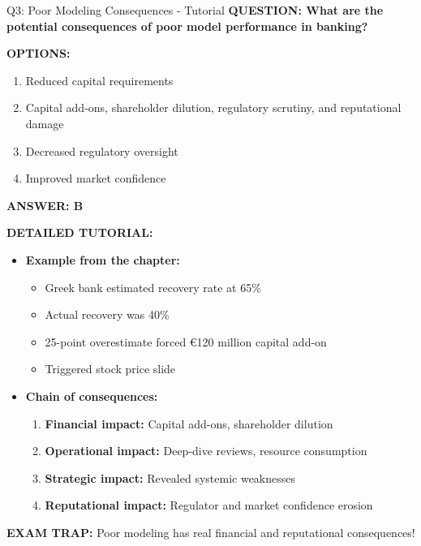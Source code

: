 \documentclass[8pt]{beamer}
\begin{document}
	\begin{frame}{Q3: Poor Modeling Consequences - Tutorial}
		\fontsize{6.5}{7.5}\selectfont
		\textbf{QUESTION: What are the potential consequences of poor model performance in banking?}
		
		\vspace{0.1cm}
		\textbf{OPTIONS:}
		\begin{enumerate}
			\item Reduced capital requirements
			\item Capital add-ons, shareholder dilution, regulatory scrutiny, and reputational damage
			\item Decreased regulatory oversight
			\item Improved market confidence
		\end{enumerate}
		
		\vspace{0.1cm}
		\textcolor{myblue}{\textbf{ANSWER: B}}
		
		\vspace{0.1cm}
		\textbf{DETAILED TUTORIAL:}
		\begin{itemize}
			\item \textbf{Example from the chapter:}
			\begin{itemize}
				\item Greek bank estimated recovery rate at 65\%
				\item Actual recovery was 40\%
				\item 25-point overestimate forced €120 million capital add-on
				\item Triggered stock price slide
			\end{itemize}
			\item \textbf{Chain of consequences:}
			\begin{enumerate}
				\item \textbf{Financial impact:} Capital add-ons, shareholder dilution
				\item \textbf{Operational impact:} Deep-dive reviews, resource consumption
				\item \textbf{Strategic impact:} Revealed systemic weaknesses
				\item \textbf{Reputational impact:} Regulator and market confidence erosion
			\end{enumerate}
		\end{itemize}
		
		\textcolor{myred}{\textbf{EXAM TRAP:}} Poor modeling has \textcolor{myblue}{real financial and reputational consequences}!
	\end{frame}
	
\end{document}
